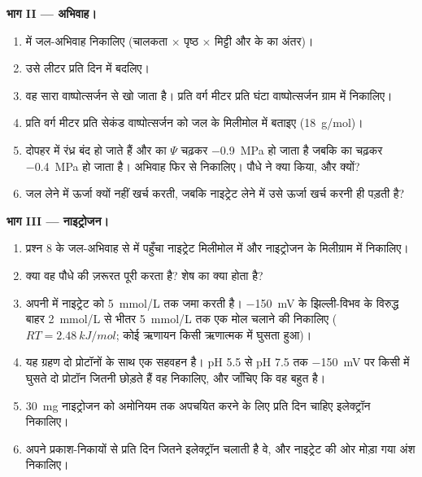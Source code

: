 \begin{problem}
\medskip
\noindent\textbf{भाग II --- अभिवाह।}
\begin{enumerate}[resume]
  \item {} में जल-अभिवाह निकालिए (चालकता $\times$
        पृष्ठ $\times$ मिट्टी और  के  का अंतर)।
  \item उसे लीटर प्रति दिन में बदलिए।
  \item वह सारा वाष्पोत्सर्जन से खो जाता है। प्रति वर्ग मीटर 
        प्रति घंटा वाष्पोत्सर्जन ग्राम में निकालिए।
  \item प्रति वर्ग मीटर  प्रति सेकंड वाष्पोत्सर्जन को जल के
        मिलीमोल में बताइए (\qty{18}{g/mol})।
  \item दोपहर में रंध्र बंद हो जाते हैं और  का $\Psi$ चढ़कर
        \qty{-0.9}{MPa} हो जाता है जबकि  का चढ़कर \qty{-0.4}{MPa}
        हो जाता है। अभिवाह फिर से निकालिए। पौधे ने क्या किया, और क्यों?
  \item {} जल लेने में ऊर्जा क्यों नहीं खर्च करती, जबकि नाइट्रेट लेने
        में उसे ऊर्जा खर्च करनी ही पड़ती है?
\end{enumerate}

\medskip
\noindent\textbf{भाग III --- नाइट्रोजन।}
\begin{enumerate}[resume]
  \item प्रश्न 8 के जल-अभिवाह से  में पहुँचा नाइट्रेट मिलीमोल में और
        नाइट्रोजन के मिलीग्राम में निकालिए।
  \item क्या वह पौधे की ज़रूरत पूरी करता है? शेष का क्या होता है?
  \item {} अपनी  में नाइट्रेट को \qty{5}{mmol/L} तक जमा करती
        है। \qty{-150}{mV} के झिल्ली-विभव के विरुद्ध बाहर
        \qty{2}{mmol/L} से भीतर \qty{5}{mmol/L} तक एक मोल चलाने की
         निकालिए ($RT = \qty{2.48}{kJ/mol}$; कोई ऋणायन किसी
        ऋणात्मक  में घुसता हुआ)।
  \item यह ग्रहण दो प्रोटॉनों के साथ एक सहवहन है। pH 5.5 से pH 7.5 तक
        \qty{-150}{mV} पर किसी  में घुसते दो प्रोटॉन जितनी  छोड़ते हैं वह निकालिए, और जाँचिए कि वह बहुत है।
  \item \qty{30}{mg} नाइट्रोजन को अमोनियम तक अपचयित करने के लिए प्रति
        दिन चाहिए इलेक्ट्रॉन निकालिए।
  \item {} अपने प्रकाश-निकायों से प्रति दिन जितने इलेक्ट्रॉन चलाती
        है वे, और नाइट्रेट की ओर मोड़ा गया अंश निकालिए।
\end{enumerate}


\end{problem}
